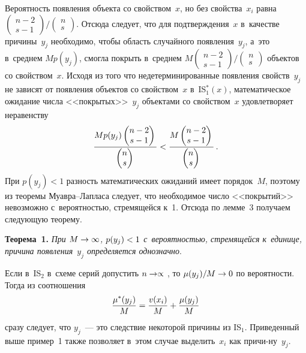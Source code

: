 \begin{multicols}{2}
  Вероятность появления объекта со свойством~$x$, но без свойства~$x_i$ равна 
  ${\begin{pmatrix}
  n-2\\ s-1
  \end{pmatrix}}/{\begin{pmatrix} n\\ s \end{pmatrix}}.$
Отсюда следует, что для подтверждения~$x$ в~качестве причины~$y_j$ 
необходимо, чтобы область случайного появления~$y_j$, а~это в~среднем 
$Mp(y_j)$, смогла покрыть в~сред\-нем 
${M\begin{pmatrix} n-2\\ s-1\end{pmatrix}}/{\begin{pmatrix} n\\ s\end{pmatrix}}$
объектов со свойством~$x$. Исходя из того что недетерминированные появления 
свойств~$y_j$ не зависят от появления объектов со свойством~$x$ в~IS$_1^* (x)$, 
математическое ожидание числа <<покрытых>>~$y_j$ объектами со 
свойством~$x$ удовлетворяет неравенству 
$$
\displaystyle\frac{\displaystyle Mp(y_j) \begin{pmatrix} n-2\\ s-1 \end{pmatrix}\mathstrut}{\displaystyle \begin{pmatrix} n\\ 
s\end{pmatrix}\mathstrut} < \displaystyle\frac{\displaystyle M\begin{pmatrix} n-2\\ s-1 \end{pmatrix}\mathstrut}{\displaystyle \begin{pmatrix} n\\ 
s\end{pmatrix}\mathstrut}\,.
$$
При $p(y_j)<1$ разность математических ожиданий имеет порядок~$M$, поэтому 
из теоремы Му\-ав\-ра--Лап\-ла\-са следует, что необходимое число 
<<покрытий>> невозможно с~вероятностью, стремящейся к~1. Отсюда по 
лемме~3 получаем следующую теорему.

  \smallskip
  
  \noindent
  \textbf{Теорема~1.} \textit{При $M\hm\to \infty$, $p(y_j)\hm<1$ 
с~ве\-ро\-ят\-ностью, стремящейся к~единице, причина  появления~$y_j$ 
определяется однозначно}. 
  
  \smallskip
  
  Если в~IS$_2$ в~схеме серий допустить $n\hm\to \propto$ , то $\mu(y_j)/M \hm\to 
0$ по вероятности. Тогда из соотношения
  $$
  \displaystyle\frac{\displaystyle \mu^*(y_j)\mathstrut}{\displaystyle M\mathstrut} =\displaystyle\frac{\displaystyle v(x_i)\mathstrut}{\displaystyle M\mathstrut} +\displaystyle\frac{\displaystyle \mu(y_j)\mathstrut}{\displaystyle M\mathstrut}
  $$
сразу следует, что $y_j$~--- это следствие некоторой причины из IS$_1$. 
Приведенный выше пример~1  также позволяет в~этом случае выделить~$x_i$ как 
причи-\linebreak ну~$y_j$.
  

\end{multicols}
